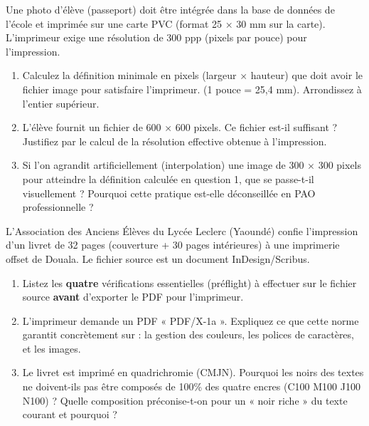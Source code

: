 \documentclass[11pt]{article}
\begin{document}
\begin{exercice}
Une photo d'élève (passeport) doit être intégrée dans la base de données de l'école et imprimée sur une carte PVC (format 25 × 30 mm sur la carte). L'imprimeur exige une résolution de 300 ppp (pixels par pouce) pour l'impression.
\begin{enumerate}
    \item Calculez la définition minimale en pixels (largeur × hauteur) que doit avoir le fichier image pour satisfaire l'imprimeur. (1 pouce = 25,4 mm). Arrondissez à l'entier supérieur.
    \item L'élève fournit un fichier de 600 × 600 pixels. Ce fichier est-il suffisant ? Justifiez par le calcul de la résolution effective obtenue à l'impression.
    \item Si l'on agrandit artificiellement (interpolation) une image de 300 × 300 pixels pour atteindre la définition calculée en question 1, que se passe-t-il visuellement ? Pourquoi cette pratique est-elle déconseillée en PAO professionnelle ?
\end{enumerate}
\end{exercice}

\begin{exercice}
L'Association des Anciens Élèves du Lycée Leclerc (Yaoundé) confie l'impression d'un livret de 32 pages (couverture + 30 pages intérieures) à une imprimerie offset de Douala. Le fichier source est un document InDesign/Scribus.
\begin{enumerate}
    \item Listez les \textbf{quatre} vérifications essentielles (préflight) à effectuer sur le fichier source \textbf{avant} d'exporter le PDF pour l'imprimeur.
    \item L'imprimeur demande un PDF « PDF/X-1a ». Expliquez ce que cette norme garantit concrètement sur : la gestion des couleurs, les polices de caractères, et les images.
    \item Le livret est imprimé en quadrichromie (CMJN). Pourquoi les noirs des textes ne doivent-ils pas être composés de 100\% des quatre encres (C100 M100 J100 N100) ? Quelle composition préconise-t-on pour un « noir riche » du texte courant et pourquoi ?
\end{enumerate}
\end{exercice}
\end{document}
